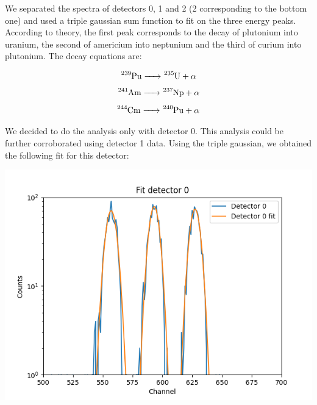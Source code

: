 \documentclass{article}
\begin{document}
\begin{multicols}{2}
We separated the spectra of
detectors 0, 1 and 2 (2 corresponding to the bottom one) and used a triple gaussian sum function to fit on the three energy peaks. According to theory, the first peak corresponds to the decay of plutonium into uranium, the second of americium into neptunium and the third of curium into plutonium. The decay equations are:

\begin{equation}
    \ce{ ^{239}Pu -> ^{235}U + \alpha}
\end{equation}
\begin{equation}
    \ce{ ^{241}Am -> ^{237}Np + \alpha}
\end{equation}
\begin{equation}
    \ce{ ^{244}Cm -> ^{240}Pu + \alpha}
\end{equation}



We decided to do the analysis only with detector 0. This analysis could be further corroborated using detector 1 data.
Using the triple gaussian, we obtained the following fit for this detector:

\begin{center}
    \label{TT_21}
    \centering
    \includegraphics[scale = 0.5]{../../images/TT_21_Chn0.png}
\end{center}


\end{multicols}
\end{document}
